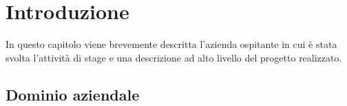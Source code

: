 
\chapter{Introduzione}
\label{cap:introduzione}
In questo capitolo viene brevemente descritta l’azienda ospitante in cui è stata
svolta l’attività di stage e una descrizione ad alto livello del progetto realizzato.




\section{Dominio aziendale}
